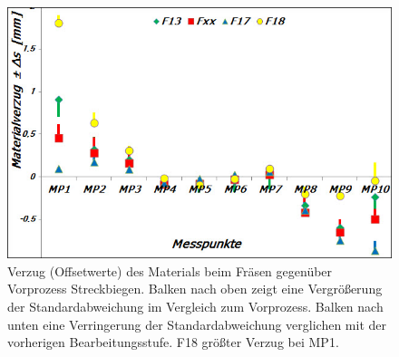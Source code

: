 \documentclass[12pt,a4paper,parskip,twoside,BCOR5mm,headsepline]{scrartcl}
\begin{document}
\newpage
\begin{figure}[hbtp]
\centering
\includegraphics[width=.8\textwidth]{verzugfraes}
\caption{Verzug (Offsetwerte) des Materials beim Fräsen gegenüber Vorprozess Streckbiegen. Balken nach oben zeigt eine Vergrößerung der Standardabweichung im Vergleich zum Vorprozess. Balken nach unten eine Verringerung der Standardabweichung verglichen mit der vorherigen Bearbeitungsstufe. F18 größter Verzug bei MP1. }
\label{fig:verzugfraes}
\end{figure}
\end{document}
